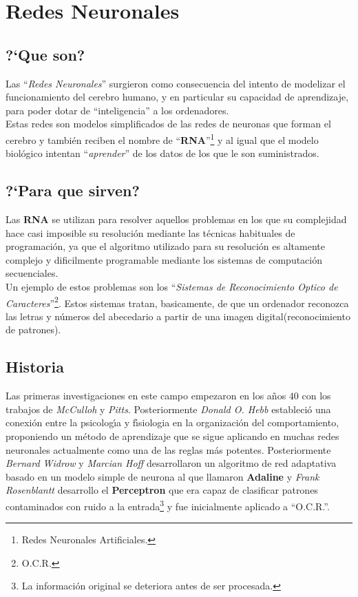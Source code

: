 %
%

\section{Redes Neuronales}

\subsection{?`Que son?}

Las ``\emph{Redes Neuronales}'' surgieron como consecuencia del intento de
modelizar el funcionamiento del cerebro humano, y en particular su capacidad de
aprendizaje, para poder dotar de ``inteligencia'' a los ordenadores.\\

Estas redes son modelos simplificados de las redes de neuronas que forman el
cerebro y tambi\'en reciben el nombre de ``\textbf{RNA}''\footnote{Redes
Neuronales Artificiales.} y al igual que el modelo biol\'ogico intentan 
``\emph{aprender}'' de los datos de los que le son suministrados.

\subsection{?`Para que sirven?}

Las \textbf{RNA} se utilizan para resolver aquellos problemas en los que su
complejidad hace casi imposible su resoluci\'on mediante las t\'ecnicas
habituales de programaci\'on, ya que el algoritmo utilizado para su
resoluci\'on es altamente complejo y dificilmente programable mediante los
sistemas de computaci\'on secuenciales.\\

Un ejemplo de estos problemas son los ``\emph{Sistemas de Reconocimiento Optico
de Caracteres}''\footnote{O.C.R.}. Estos sistemas tratan, basicamente, de que
un ordenador reconozca las letras y n\'umeros del abecedario a partir de una
imagen digital(reconocimiento de patrones).

\subsection{Historia}

Las primeras investigaciones en este campo empezaron en los a\~nos $40$ con los
trabajos de \emph{McCulloh} y \emph{Pitts}. Posteriormente \emph{Donald O. Hebb}
estableci\'o una conexi\'on entre la psicolog\'{\i}a y  f\'{\i}siologia en la
organizaci\'on del comportamiento, proponiendo un m\'etodo de aprendizaje que se
sigue aplicando en muchas redes neuronales actualmente como una de las reglas
m\'as potentes.
%
\newpage
%
Posteriormente \emph{Bernard Widrow} y \emph{Marcian Hoff} desarrollaron un
algoritmo de red adaptativa basado en un modelo simple de neurona al que
llamaron \textbf{Adaline} y \emph{Frank Rosenblantt} desarrollo el
\textbf{Perceptron} que era capaz de clasificar patrones contaminados con
ruido a la entrada\footnote{La informaci\'on original se deteriora antes de ser
procesada.} y fue inicialmente aplicado a ``O.C.R.''.\\

